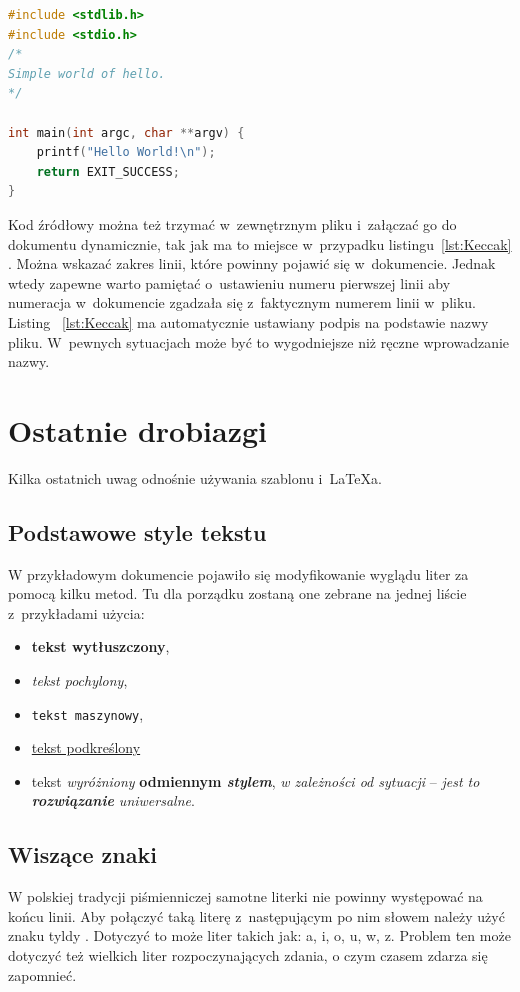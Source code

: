 \begin{lstlisting}[language=C,
    backgroundcolor=\color{EEGold!5!white},
    caption={Prosty program w~języku C},
    label={lst:helloC}]
#include <stdlib.h>
#include <stdio.h>
/* 
Simple world of hello.
*/

int main(int argc, char **argv) {
	printf("Hello World!\n");
	return EXIT_SUCCESS;
}
\end{lstlisting}

Kod źródłowy można też trzymać w~zewnętrznym pliku i~załączać go do dokumentu dynamicznie, tak jak ma to miejsce
w~przypadku listingu~\ref{lst:Keccak}
. Można wskazać zakres linii, które powinny pojawić się w~dokumencie. Jednak wtedy zapewne warto pamiętać o~ustawieniu
numeru pierwszej linii aby numeracja w~dokumencie zgadzała się z~faktycznym numerem linii w~pliku. Listing~
\ref{lst:Keccak}
ma automatycznie ustawiany podpis na podstawie nazwy pliku. W~pewnych sytuacjach może być to wygodniejsze niż ręczne
wprowadzanie nazwy.




\section{Ostatnie drobiazgi}
Kilka ostatnich uwag odnośnie używania szablonu i~\LaTeX{a}.

\subsection{Podstawowe style tekstu}
W przykładowym dokumencie pojawiło się modyfikowanie wyglądu liter za pomocą kilku metod. Tu dla porządku zostaną one
zebrane na jednej liście z~przykładami użycia:
\begin{itemize}
    \item \textbf{tekst wytłuszczony},
    \item \textit{tekst pochylony},
    \item \texttt{tekst maszynowy},
    \item \underline{tekst podkreślony}
    \item tekst \emph{wyróżniony} \textbf{odmiennym \emph{stylem}}, \textit{w zależności \emph{od sytuacji}} --
    \emph{jest to \textbf{rozwiązanie} \textit{uniwersalne}}.
\end{itemize}

\subsection{Wiszące znaki}
W polskiej tradycji piśmienniczej samotne literki nie powinny występować na końcu linii. Aby połączyć taką literę
z~następującym po nim słowem należy użyć znaku tyldy \keys{\textasciitilde{}}
. Dotyczyć to może liter takich jak: a, i, o, u, w, z. Problem ten może dotyczyć też wielkich liter rozpoczynających
zdania, o czym czasem zdarza się zapomnieć.


